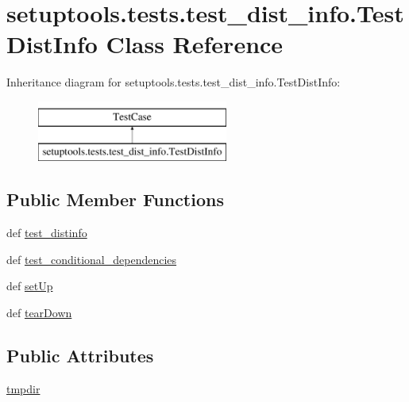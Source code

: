 \hypertarget{classsetuptools_1_1tests_1_1test__dist__info_1_1TestDistInfo}{}\section{setuptools.\+tests.\+test\+\_\+dist\+\_\+info.\+Test\+Dist\+Info Class Reference}
\label{classsetuptools_1_1tests_1_1test__dist__info_1_1TestDistInfo}
Inheritance diagram for setuptools.\+tests.\+test\+\_\+dist\+\_\+info.\+Test\+Dist\+Info\+:\begin{figure}[H]
\begin{center}
\leavevmode
\includegraphics[height=2.000000cm]{classsetuptools_1_1tests_1_1test__dist__info_1_1TestDistInfo}
\end{center}
\end{figure}
\subsection*{Public Member Functions}
\begin{DoxyCompactItemize}
\item 
def \hyperlink{classsetuptools_1_1tests_1_1test__dist__info_1_1TestDistInfo_a13cc37db8c64890b332ba58a28e6609a}{test\+\_\+distinfo}
\item 
def \hyperlink{classsetuptools_1_1tests_1_1test__dist__info_1_1TestDistInfo_af5c97f958de0869ef2adb14cd1780a72}{test\+\_\+conditional\+\_\+dependencies}
\item 
def \hyperlink{classsetuptools_1_1tests_1_1test__dist__info_1_1TestDistInfo_ab1e1c042dbe9e6ef4cc0bd298099cfcb}{set\+Up}
\item 
def \hyperlink{classsetuptools_1_1tests_1_1test__dist__info_1_1TestDistInfo_ab68c718031c444538308d2bd10aac330}{tear\+Down}
\end{DoxyCompactItemize}
\subsection*{Public Attributes}
\begin{DoxyCompactItemize}
\item 
\hyperlink{classsetuptools_1_1tests_1_1test__dist__info_1_1TestDistInfo_a4a917dd652be3378ba99308f453b3534}{tmpdir}
\end{DoxyCompactItemize}


